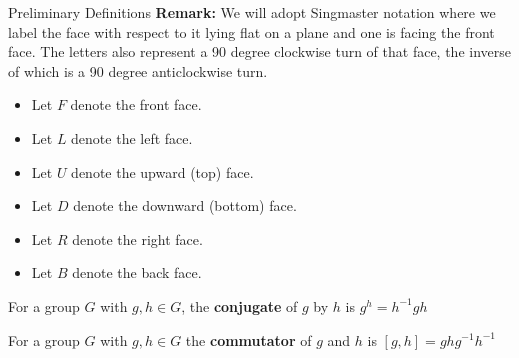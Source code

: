 \documentclass[final]{beamer}
\newlength{\colwidth}
\begin{document}
\begin{frame}[t]
\begin{columns}[t]
\begin{column}{\colwidth}
\begin{alertblock}{Preliminary Definitions}
\textbf{Remark:}
We will adopt Singmaster notation where
we label the face with respect to it lying
flat on a plane and one is facing the front face. The letters also represent a 90 degree clockwise turn of that face, the inverse of which is a 90 degree anticlockwise turn.


\begin{itemize}
\item Let $F$ denote the front face.
\item Let $L$ denote the left face.
\item Let $U$ denote the upward (top) face.
\item Let $D$ denote the downward (bottom) face.
\item Let $R$ denote the right face.
\item Let $B$ denote the back face.
\end{itemize}

For a group $G$ with $g,h \in G$, the \textbf{conjugate} of $g$ by $h$ is
$g^h = h^{-1}gh$

For a group $G$ with $g,h \in G$
the \textbf{commutator} of $g$ and $h$ is
$[g,h]=ghg^{-1}h^{-1}$







\end{alertblock}
\end{column}
\end{columns}
\end{frame}
\end{document}
